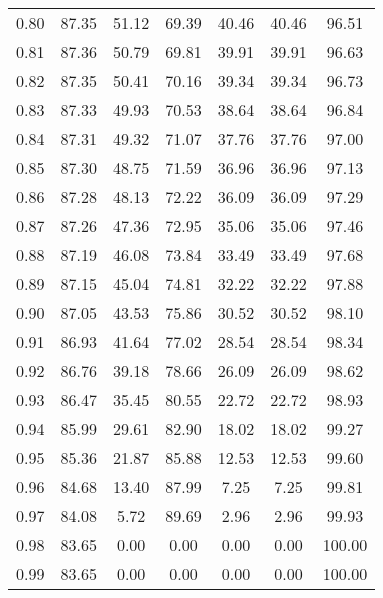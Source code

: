 \begin{tabular}{|c|c|c|c|c|c|c|}
      0.80 &     87.35 &     51.12 &      69.39 &   40.46 &      40.46 &         96.51 \\
      0.81 &     87.36 &     50.79 &      69.81 &   39.91 &      39.91 &         96.63 \\
      0.82 &     87.35 &     50.41 &      70.16 &   39.34 &      39.34 &         96.73 \\
      0.83 &     87.33 &     49.93 &      70.53 &   38.64 &      38.64 &         96.84 \\
      0.84 &     87.31 &     49.32 &      71.07 &   37.76 &      37.76 &         97.00 \\
      0.85 &     87.30 &     48.75 &      71.59 &   36.96 &      36.96 &         97.13 \\
      0.86 &     87.28 &     48.13 &      72.22 &   36.09 &      36.09 &         97.29 \\
      0.87 &     87.26 &     47.36 &      72.95 &   35.06 &      35.06 &         97.46 \\
      0.88 &     87.19 &     46.08 &      73.84 &   33.49 &      33.49 &         97.68 \\
      0.89 &     87.15 &     45.04 &      74.81 &   32.22 &      32.22 &         97.88 \\
      0.90 &     87.05 &     43.53 &      75.86 &   30.52 &      30.52 &         98.10 \\
      0.91 &     86.93 &     41.64 &      77.02 &   28.54 &      28.54 &         98.34 \\
      0.92 &     86.76 &     39.18 &      78.66 &   26.09 &      26.09 &         98.62 \\
      0.93 &     86.47 &     35.45 &      80.55 &   22.72 &      22.72 &         98.93 \\
      0.94 &     85.99 &     29.61 &      82.90 &   18.02 &      18.02 &         99.27 \\
      0.95 &     85.36 &     21.87 &      85.88 &   12.53 &      12.53 &         99.60 \\
      0.96 &     84.68 &     13.40 &      87.99 &    7.25 &       7.25 &         99.81 \\
      0.97 &     84.08 &      5.72 &      89.69 &    2.96 &       2.96 &         99.93 \\
      0.98 &     83.65 &      0.00 &       0.00 &    0.00 &       0.00 &        100.00 \\
      0.99 &     83.65 &      0.00 &       0.00 &    0.00 &       0.00 &        100.00 \\
\bottomrule
\end{tabular}
